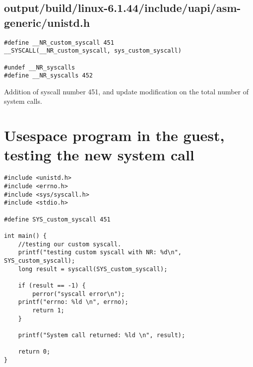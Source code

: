 \documentclass[a4paper,11pt]{article}
\begin{document}
\subsection{output/build/linux-6.1.44/include/uapi/asm-generic/unistd.h}
    \begin{lstlisting}
#define __NR_custom_syscall 451
__SYSCALL(__NR_custom_syscall, sys_custom_syscall)

#undef __NR_syscalls
#define __NR_syscalls 452

    \end{lstlisting}
Addition of syscall number 451, and update modification on the total number of system calls.

\section{ Usespace program in the guest, testing the new system call}
\begin{lstlisting}
#include <unistd.h>
#include <errno.h>
#include <sys/syscall.h>
#include <stdio.h>

#define SYS_custom_syscall 451

int main() {
	//testing our custom syscall.
    printf("testing custom syscall with NR: %d\n", SYS_custom_syscall);
    long result = syscall(SYS_custom_syscall);

    if (result == -1) {
        perror("syscall error\n");
    printf("errno: %ld \n", errno);
        return 1;
    }

    printf("System call returned: %ld \n", result);

    return 0;
}

\end{lstlisting}
\end{document}
